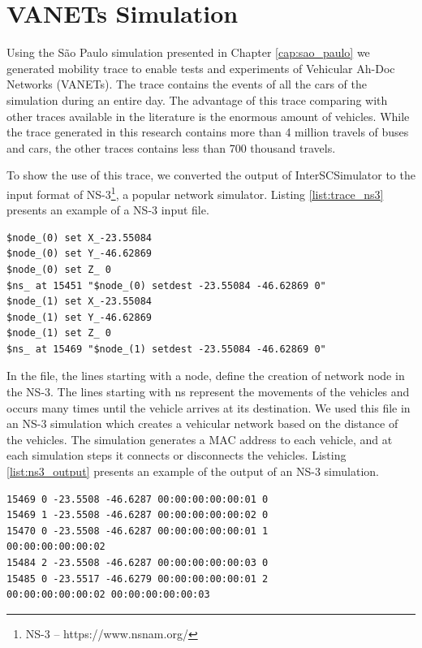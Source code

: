 \section{VANETs Simulation}
\label{sec:vanet}

Using the S\~ao Paulo simulation presented in Chapter \ref{cap:sao_paulo} we generated mobility trace to enable tests and experiments of Vehicular Ah-Doc Networks (VANETs). The trace contains the events of all the cars of the simulation during an entire day. The advantage of this trace comparing with other traces available in the literature is the enormous amount of vehicles. While the trace generated in this research contains more than 4 million travels of buses and cars, the other traces contains less than 700 thousand travels.

To show the use of this trace, we converted the output of InterSCSimulator to the input format of NS-3\footnote{NS-3 -- https://www.nsnam.org/}, a popular network simulator. Listing \ref{list:trace_ns3} presents an example of a NS-3 input file.

\renewcommand{\thelstlisting}{\arabic{lstlisting}}
\begin{lstlisting}[caption=NS-3 input file, label=list:trace_ns3, upquote=true]
$node_(0) set X_-23.55084
$node_(0) set Y_-46.62869
$node_(0) set Z_ 0
$ns_ at 15451 "$node_(0) setdest -23.55084 -46.62869 0"
$node_(1) set X_-23.55084
$node_(1) set Y_-46.62869
$node_(1) set Z_ 0
$ns_ at 15469 "$node_(1) setdest -23.55084 -46.62869 0"
\end{lstlisting}

In the file, the lines starting with a \textdollar node, define the creation of network node in the NS-3. The lines starting with \textdollar ns represent the movements of the vehicles and occurs many times until the vehicle arrives at its destination. We used this file in an NS-3 simulation which creates a vehicular network based on the distance of the vehicles. The simulation generates a MAC address to each vehicle, and at each simulation steps it connects or disconnects the vehicles. Listing \ref{list:ns3_output} presents an example of the output of an NS-3 simulation.

\renewcommand{\thelstlisting}{\arabic{lstlisting}}
\begin{lstlisting}[caption=NS-3 Output, label=list:ns3_output, upquote=true]
15469 0 -23.5508 -46.6287 00:00:00:00:00:01 0 
15469 1 -23.5508 -46.6287 00:00:00:00:00:02 0 
15470 0 -23.5508 -46.6287 00:00:00:00:00:01 1 
00:00:00:00:00:02 
15484 2 -23.5508 -46.6287 00:00:00:00:00:03 0 
15485 0 -23.5517 -46.6279 00:00:00:00:00:01 2 
00:00:00:00:00:02 00:00:00:00:00:03 
\end{lstlisting}

